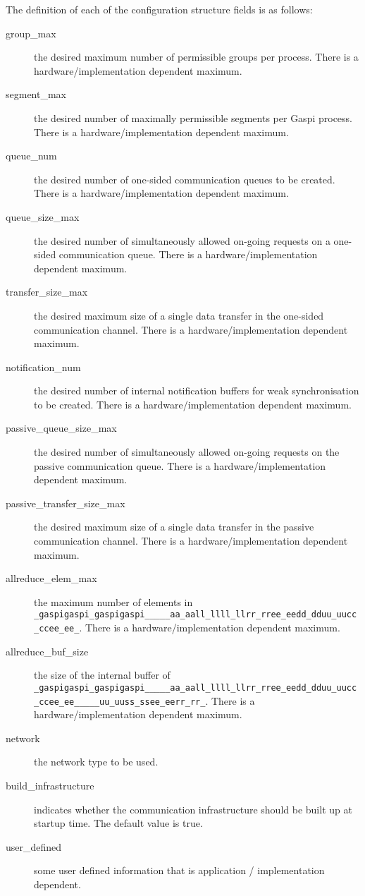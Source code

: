 \documentclass[a4paper]{article}
\makeatletter
\newlength{\st}\setlength{\st}{0pt}
\newcommand{\zerowsep}{\hskip 0pt plus 0.1pt minus 0.1pt}
\newcommand{\ZSEP}[1]{\ifx#1\@@@EOZ@@@\let\next\relax\else\ifx#1\_#1\zerowsep\else#1\fi\let\next\ZSEP\fi\next}
\newcommand{\zsep}[1]{\ZSEP{}#1\@@@EOZ@@@}
\newcommand{\gaspiprefix}{gaspi}
\newcommand{\GASPI}{{\sc Gaspi}}
\newcommand{\function}[1]{{\tt #1}}
\newcommand{\gaspifunction}[1]{\function{\protect\zsep{\gaspiprefix\_#1}}}
\makeatother
\begin{document}
The definition of each of the configuration structure fields is as follows:

\begin{description}
\item[group\_max] the desired maximum number of permissible groups per process. There is a hardware/implementation dependent maximum.
\item[segment\_max] the desired number of maximally permissible segments per \GASPI{} process.
There is a hardware/implementation dependent maximum.
\item[queue\_num] the desired number of one-sided communication queues to be created. There is a hardware/implementation
dependent maximum.
\item[queue\_size\_max] the desired number of simultaneously allowed on-going requests on a one-sided communication queue.
There is a hardware/implementation dependent maximum.
\item[transfer\_size\_max] the desired maximum size of a single data
  transfer in the one-sided communication channel.
There is a hardware/implementation dependent maximum.
\item[notification\_num] the desired number of internal notification buffers for weak synchronisation to be created.
There is a hardware/implementation dependent maximum.
\item[passive\_queue\_size\_max] the desired number of simultaneously allowed on-going requests on the
passive communication queue. There is a hardware/implementation dependent maximum.
\item[passive\_transfer\_size\_max] the desired maximum size of a
  single data transfer in the passive communication channel.
There is a hardware/implementation dependent maximum.
\item[allreduce\_elem\_max] the maximum number of elements in \gaspifunction{allreduce}.
There is a hardware/implementation dependent maximum.
\item[allreduce\_buf\_size] the size of the internal buffer of \gaspifunction{allreduce\_user}.
There is a hardware/implementation dependent maximum.
\item[network] the network type to be used.
\item[build\_infrastructure] indicates whether the communication infrastructure should
be built up at startup time. The default value is true.
\item[user\_defined] some user defined information that is application / implementation dependent.
\end{description}
\end{document}
